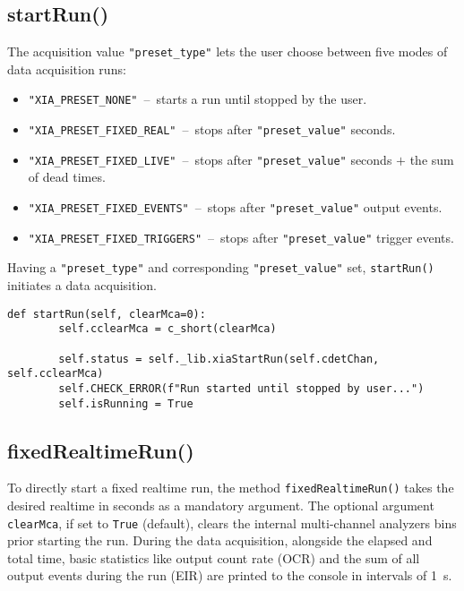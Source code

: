         \subsection{startRun()}\label{sec:startRun}
            The acquisition value \texttt{"preset\_type"} lets the user choose between five modes of data acquisition runs:
            \begin{itemize}
                \item \texttt{"XIA\_PRESET\_NONE"}~--~starts a run until stopped by the user.
                \item \texttt{"XIA\_PRESET\_FIXED\_REAL"}~--~stops after \texttt{"preset\_value"} seconds.
                \item \texttt{"XIA\_PRESET\_FIXED\_LIVE"}~--~stops after \texttt{"preset\_value"} seconds \(+\) the sum of dead times.
                \item \texttt{"XIA\_PRESET\_FIXED\_EVENTS"}~--~stops after \texttt{"preset\_value"} output events.
                \item \texttt{"XIA\_PRESET\_FIXED\_TRIGGERS"}~--~stops after \texttt{"preset\_value"} trigger events.
            \end{itemize}
            Having a \texttt{"preset\_type"} and corresponding \texttt{"preset\_value"} set, \texttt{startRun()} initiates a data acquisition.\par\medskip

            \begin{lstlisting}[style=mypython, firstnumber=217, caption={[XMagix method startRun()]XMagix method startRun().}, label={lst:xmagix startRun}]
    def startRun(self, clearMca=0):
        self.cclearMca = c_short(clearMca)

        self.status = self._lib.xiaStartRun(self.cdetChan, self.cclearMca)
        self.CHECK_ERROR(f"Run started until stopped by user...")
        self.isRunning = True
            \end{lstlisting}

        \subsection{fixedRealtimeRun()}\label{sec:fixedRealtimeRun}
            To directly start a fixed realtime run, the method \texttt{fixedRealtimeRun()} takes the desired realtime in seconds as a mandatory argument.
            The optional argument \texttt{clearMca}, if set to \texttt{True} (default), clears the internal multi-channel analyzers bins prior starting the run.
            During the data acquisition, alongside the elapsed and total time, basic statistics like output count rate (OCR) and the sum of all output events during the run (EIR) are printed to the console in intervals of \qty{1}{\second}.\par\medskip

